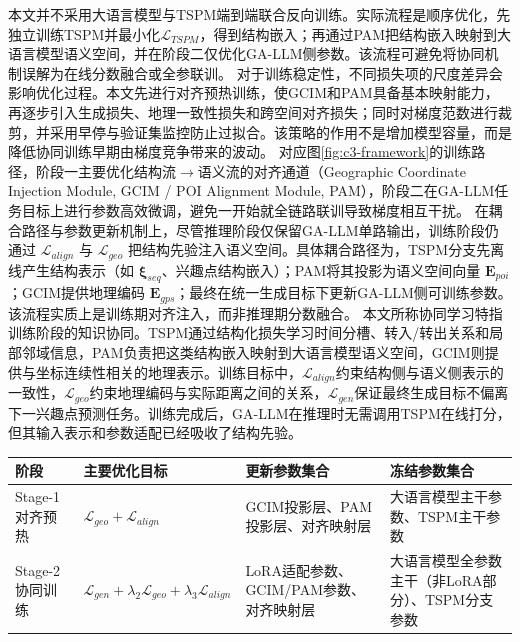 本文并不采用大语言模型与TSPM端到端联合反向训练。实际流程是顺序优化，先独立训练TSPM并最小化$\mathcal{L}_{TSPM}$，得到结构嵌入；再通过PAM把结构嵌入映射到大语言模型语义空间，并在阶段二仅优化GA-LLM侧参数。该流程可避免将协同机制误解为在线分数融合或全参联训。
对于训练稳定性，不同损失项的尺度差异会影响优化过程。本文先进行对齐预热训练，使GCIM和PAM具备基本映射能力，再逐步引入生成损失、地理一致性损失和跨空间对齐损失；同时对梯度范数进行裁剪，并采用早停与验证集监控防止过拟合。该策略的作用不是增加模型容量，而是降低协同训练早期由梯度竞争带来的波动。
对应图\ref{fig:c3-framework}的训练路径，阶段一主要优化结构流$\rightarrow$语义流的对齐通道（Geographic Coordinate Injection Module, GCIM / POI Alignment Module, PAM），阶段二在GA-LLM任务目标上进行参数高效微调，避免一开始就全链路联训导致梯度相互干扰。
在耦合路径与参数更新机制上，尽管推理阶段仅保留GA-LLM单路输出，训练阶段仍通过 $\mathcal{L}_{align}$ 与 $\mathcal{L}_{geo}$ 把结构先验注入语义空间。具体耦合路径为，TSPM分支先离线产生结构表示（如 $\boldsymbol{\xi}_{seq}$、兴趣点结构嵌入）；PAM将其投影为语义空间向量 $\mathbf{E}_{poi}$；GCIM提供地理编码 $\mathbf{E}_{gps}$；最终在统一生成目标下更新GA-LLM侧可训练参数。该流程实质上是训练期对齐注入，而非推理期分数融合。
本文所称协同学习特指训练阶段的知识协同。TSPM通过结构化损失学习时间分槽、转入/转出关系和局部邻域信息，PAM负责把这类结构嵌入映射到大语言模型语义空间，GCIM则提供与坐标连续性相关的地理表示。训练目标中，$\mathcal{L}_{align}$约束结构侧与语义侧表示的一致性，$\mathcal{L}_{geo}$约束地理编码与实际距离之间的关系，$\mathcal{L}_{gen}$保证最终生成目标不偏离下一兴趣点预测任务。训练完成后，GA-LLM在推理时无需调用TSPM在线打分，但其输入表示和参数适配已经吸收了结构先验。

\begin{table}[htbp]
    \cThreeTblStyle
    \label{tab:c3-stage-update}
    \begin{tabular}{P{0.15\textwidth}P{0.24\textwidth}P{0.24\textwidth}P{0.25\textwidth}}
        \toprule
        阶段 & 主要优化目标 & 更新参数集合 & 冻结参数集合 \\
        \midrule
        Stage-1 对齐预热 & $\mathcal{L}_{geo}+\mathcal{L}_{align}$ & GCIM投影层、PAM投影层、对齐映射层 & 大语言模型主干参数、TSPM主干参数 \\
        Stage-2 协同训练 & $\mathcal{L}_{gen}+\lambda_2\mathcal{L}_{geo}+\lambda_3\mathcal{L}_{align}$ & LoRA适配参数、GCIM/PAM参数、对齐映射层 & 大语言模型全参数主干（非LoRA部分）、TSPM分支参数 \\
        \bottomrule
    \end{tabular}
\end{table}

